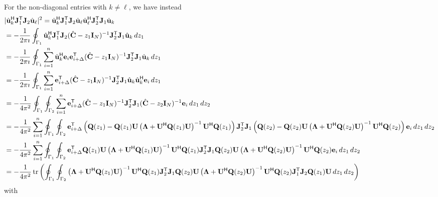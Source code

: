 \documentclass[11pt,a4paper]{article}
\begin{document}
For the non-diagonal entries with $k \neq \ell$, we have instead
\begin{align*}
		&|\hat \uu_k^\H \J_1^\T \J_2 \hat \uu_\ell|^2 = \hat \uu_k^\H \J_1^\T \J_2 \hat \uu_\ell \hat \uu_\ell^\H \J_2^\T \J_1 \hat \uu_k \\
		&= -\frac1{2 \pi \imath} \oint_{\Gamma_1} \hat \uu_k^\H \J_1^\T \J_2 (\hat \C - z_1 \I_N)^{-1} \J_2^\T \J_1 \hat \uu_k\,dz_1 \\
		&= -\frac1{2 \pi \imath} \oint_{\Gamma_1} \sum_{i=1}^n \hat \uu_k^\H \ee_i \ee_{i + \Delta}^\T (\hat \C - z_1 \I_N)^{-1} \J_2^\T \J_1 \hat \uu_k\,dz_1 \\
		&= -\frac1{2 \pi \imath} \oint_{\Gamma_1} \sum_{i=1}^n \ee_{i + \Delta}^\T (\hat \C - z_1 \I_N)^{-1} \J_2^\T \J_1 \hat \uu_k \hat \uu_k^\H \ee_i\,dz_1 \\
		&= -\frac1{4 \pi^2} \oint_{\Gamma_1} \oint_{\Gamma_2} \sum_{i=1}^n \ee_{i + \Delta}^\T (\hat \C - z_1 \I_N)^{-1} \J_2^\T \J_1 (\hat \C - z_2 \I_N)^{-1} \ee_i\,dz_1\,dz_2 \\
		&= -\frac1{4 \pi^2} \sum_{i=1}^n \oint_{\Gamma_1} \oint_{\Gamma_2} \ee_{i + \Delta}^\T \left(  \Q(z_1) - \Q(z_1) \U \left( \bLambda + \U^\H \Q(z_1) \U \right)^{-1} \U^\H \Q(z_1) \right) \J_2^\T \J_1 \left(  \Q(z_2) - \Q(z_2) \U \left( \bLambda + \U^\H \Q(z_2) \U \right)^{-1} \U^\H \Q(z_2) \right) \ee_{i}\,dz_1\,dz_2 \\ 
		&= -\frac1{4 \pi^2} \sum_{i=1}^n \oint_{\Gamma_1} \oint_{\Gamma_2} \ee_{i + \Delta}^\T \Q(z_1) \U \left( \bLambda + \U^\H \Q(z_1) \U \right)^{-1} \U^\H \Q(z_1) \J_2^\T \J_1 \Q(z_2) \U \left( \bLambda + \U^\H \Q(z_2) \U \right)^{-1} \U^\H \Q(z_2) \ee_{i}\,dz_1\,dz_2 \\ 
		&=- \frac1{4 \pi^2} \tr \left( \oint_{\Gamma_1} \oint_{\Gamma_2} \left( \bLambda + \U^\H \Q(z_1) \U \right)^{-1} \U^\H \Q(z_1) \J_2^\T \J_1 \Q(z_2) \U \left( \bLambda + \U^\H \Q(z_2) \U \right)^{-1} \U^\H \Q(z_2) \J_1^\T \J_2 \Q(z_1) \U \,dz_1\,dz_2 \right)
\end{align*}
with 
\end{document}
